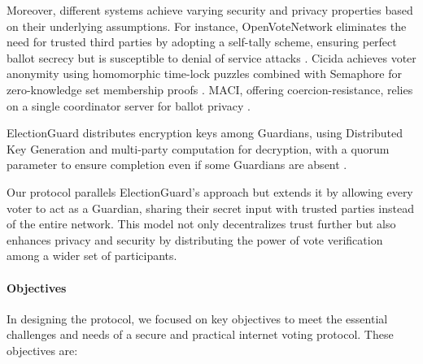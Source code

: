 \documentclass[runningheads]{llncs}
\begin{document}
Moreover, different systems achieve varying security and privacy properties based on their underlying assumptions. For instance, OpenVoteNetwork eliminates the need for trusted third parties by adopting a self-tally scheme, ensuring perfect ballot secrecy but is susceptible to denial of service attacks \cite{haoAnonymousVotingTworound2010, mccorrySmartContractBoardroom2017, seifelnasrScalableOpenVoteNetwork2020, elsheikhDisputefreeScalableOpen2022}. Cicida achieves voter anonymity using homomorphic time-lock puzzles combined with Semaphore for zero-knowledge set membership proofs \cite{BuildingCicadaPrivate, A16zCicada2023}. MACI, offering coercion-resistance, relies on a single coordinator server for ballot privacy \cite{ethereumfoundationMinimalAntiCollusionInfrastructure2022, PrivacyscalingexplorationsMaci2023}.

ElectionGuard distributes encryption keys among Guardians, using Distributed Key Generation and multi-party computation for decryption, with a quorum parameter to ensure completion even if some Guardians are absent \cite{ElectionGuard}.

Our protocol parallels ElectionGuard's approach but extends it by allowing every voter to act as a Guardian, sharing their secret input with trusted parties instead of the entire network. This model not only decentralizes trust further but also enhances privacy and security by distributing the power of vote verification among a wider set of participants.


\paragraph{Objectives}
In designing the protocol, we focused on key objectives to meet the essential challenges and needs of a secure and practical internet voting protocol. These objectives are:
\end{document}
